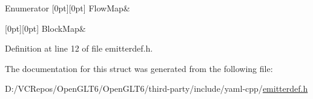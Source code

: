 \begin{DoxyEnumFields}{Enumerator}
[0pt][0pt]{}\mbox{\label{struct_y_a_m_l_1_1_emitter_node_type_ac42d64defd19943e78fd749faade2103adbb8c5a6cfd9015e6f732390f80b7d30}} 
Flow\+Map&\\
\hline

[0pt][0pt]{}\mbox{\label{struct_y_a_m_l_1_1_emitter_node_type_ac42d64defd19943e78fd749faade2103a1fc0038fc6e8b18a83ff9c1f6ec20fe0}} 
Block\+Map&\\
\hline

\end{DoxyEnumFields}


Definition at line 12 of file emitterdef.\+h.



The documentation for this struct was generated from the following file\+:\begin{DoxyCompactItemize}
\item 
D\+:/\+V\+C\+Repos/\+Open\+G\+L\+T6/\+Open\+G\+L\+T6/third-\/party/include/yaml-\/cpp/\mbox{\hyperlink{emitterdef_8h}{emitterdef.\+h}}\end{DoxyCompactItemize}
